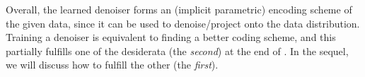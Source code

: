 \documentclass[../../book-main.tex]{subfiles}
\begin{document}

Overall, the learned denoiser forms an (implicit parametric) encoding scheme of the given data, since it can be used to denoise/project onto the data distribution. Training a denoiser is equivalent to finding a better coding scheme, and this partially fulfills one of the desiderata (the \textit{second}) at the end of . In the sequel, we will discuss how to fulfill the other (the \textit{first}).
\end{document}

